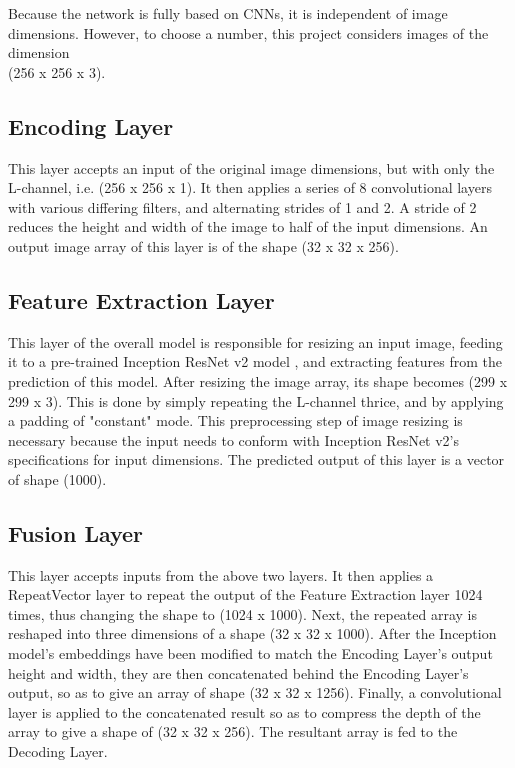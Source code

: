 \documentclass[10pt,twocolumn,letterpaper]{article}
\begin{document}
	Because the network is fully based on CNNs, it is independent of image dimensions. However, to choose a number, this project considers images of the dimension\\(256 x 256 x 3).

	\subsection{Encoding Layer}
	This layer accepts an input of the original image dimensions, but with only the L-channel, i.e. (256 x 256 x 1). It then applies a series of 8 convolutional layers with various differing filters, and alternating strides of 1 and 2. A stride of 2 reduces the height and width of the image to half of the input dimensions. An output image array of this layer is of the shape (32 x 32 x 256).

	\subsection{Feature Extraction Layer}
	This layer of the overall model is responsible for resizing an input image, feeding it to a pre-trained Inception ResNet v2 model \cite{Inception}, and extracting features from the prediction of this model. After resizing the image array, its shape becomes (299 x 299 x 3). This is done by simply repeating the L-channel thrice, and by applying a padding of "constant" mode. This preprocessing step of image resizing is necessary because the input needs to conform with Inception ResNet v2's specifications for input dimensions. The predicted output of this layer is a vector of shape (1000).

	\subsection{Fusion Layer}
	This layer accepts inputs from the above two layers. It then applies a RepeatVector layer \cite{Keras} to repeat the output of the Feature Extraction layer 1024 times, thus changing the shape to (1024 x 1000). Next, the repeated array is reshaped into three dimensions of a shape (32 x 32 x 1000). After the Inception model's embeddings have been modified to match the Encoding Layer's output height and width, they are then concatenated behind the Encoding Layer's output, so as to give an array of shape (32 x 32 x 1256). Finally, a convolutional layer is applied to the concatenated result so as to compress the depth of the array to give a shape of (32 x 32 x 256). The resultant array is fed to the Decoding Layer.
\end{document}
